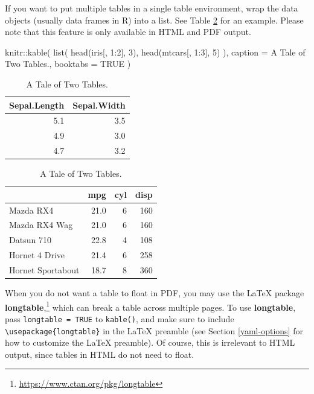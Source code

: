\documentclass[
  12pt,
]{krantz}
\newenvironment{Shaded}{\begin{snugshade}}{\end{snugshade}}
\newcommand{\AttributeTok}[1]{\textcolor[rgb]{0.77,0.63,0.00}{#1}}
\newcommand{\ConstantTok}[1]{\textcolor[rgb]{0.00,0.00,0.00}{#1}}
\newcommand{\DecValTok}[1]{\textcolor[rgb]{0.00,0.00,0.81}{#1}}
\newcommand{\FunctionTok}[1]{\textcolor[rgb]{0.00,0.00,0.00}{#1}}
\newcommand{\NormalTok}[1]{#1}
\newcommand{\SpecialCharTok}[1]{\textcolor[rgb]{0.00,0.00,0.00}{#1}}
\newcommand{\StringTok}[1]{\textcolor[rgb]{0.31,0.60,0.02}{#1}}
\renewcommand{\href}[2]{#2\footnote{\url{#1}}}
\theoremstyle{definition}
\theoremstyle{definition}
\theoremstyle{definition}
\theoremstyle{definition}
\theoremstyle{remark}
\begin{document}
If you want to put multiple tables in a single table environment, wrap the data objects (usually data frames in R) into a list. See Table \ref{tab:table-multi} for an example. Please note that this feature is only available in HTML and PDF output.

\begin{Shaded}
\begin{Highlighting}[]
\NormalTok{knitr}\SpecialCharTok{::}\FunctionTok{kable}\NormalTok{(}
  \FunctionTok{list}\NormalTok{(}
    \FunctionTok{head}\NormalTok{(iris[, }\DecValTok{1}\SpecialCharTok{:}\DecValTok{2}\NormalTok{], }\DecValTok{3}\NormalTok{),}
    \FunctionTok{head}\NormalTok{(mtcars[, }\DecValTok{1}\SpecialCharTok{:}\DecValTok{3}\NormalTok{], }\DecValTok{5}\NormalTok{)}
\NormalTok{  ),}
  \AttributeTok{caption =} \StringTok{\textquotesingle{}A Tale of Two Tables.\textquotesingle{}}\NormalTok{, }\AttributeTok{booktabs =} \ConstantTok{TRUE}
\NormalTok{)}
\end{Highlighting}
\end{Shaded}

\begin{table}
\caption{\label{tab:table-multi}A Tale of Two Tables.}

\centering
\begin{tabular}[t]{rr}
\toprule
Sepal.Length & Sepal.Width\\
\midrule
5.1 & 3.5\\
4.9 & 3.0\\
4.7 & 3.2\\
\bottomrule
\end{tabular}
\centering
\begin{tabular}[t]{lrrr}
\toprule
  & mpg & cyl & disp\\
\midrule
Mazda RX4 & 21.0 & 6 & 160\\
Mazda RX4 Wag & 21.0 & 6 & 160\\
Datsun 710 & 22.8 & 4 & 108\\
Hornet 4 Drive & 21.4 & 6 & 258\\
Hornet Sportabout & 18.7 & 8 & 360\\
\bottomrule
\end{tabular}
\end{table}

When you do not want a table to float in PDF, you may use the LaTeX package \href{https://www.ctan.org/pkg/longtable}{\textbf{longtable},} which can break a table across multiple pages. To use \textbf{longtable}, pass \texttt{longtable\ =\ TRUE} to \texttt{kable()}, and make sure to include \texttt{\textbackslash{}usepackage\{longtable\}} in the LaTeX preamble (see Section \ref{yaml-options} for how to customize the LaTeX preamble). Of course, this is irrelevant to HTML output, since tables in HTML do not need to float.
\end{document}
